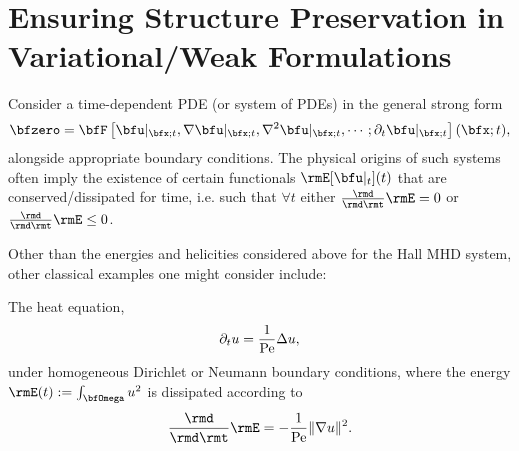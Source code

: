 \section{Ensuring Structure Preservation in Variational/Weak Formulations}

    Consider a time-dependent PDE (or system of PDEs) in the general strong form
    \begin{equation}\label{eqn:general time-dependent PDE}
        \bfzero  =  \bfF\left[\bfu|_{\bfx; t}, \nabla\bfu|_{\bfx; t}, \nabla^{2}\bfu|_{\bfx; t}, \cdots; \partial_{t}\bfu|_{\bfx; t}\right](\bfx; t),
    \end{equation}
    alongside appropriate boundary conditions. The physical origins of such systems often imply the existence of certain functionals $\rmE[\bfu|_{t}](t)$ that are conserved/dissipated for time, i.e. such that $\forall  t$ either $\frac{\rmd}{\rmd\rmt}\rmE  =  0$ or $\frac{\rmd}{\rmd\rmt}\rmE  \leq  0$.
    
    \line
    
    Other than the energies and helicities considered above for the Hall MHD system, other classical examples one might consider include:
    \begin{example}
        The heat equation,
        \begin{equation}
            \partial_{t}u  =  \frac{1}{\mathrm{Pe}}\Delta u,
        \end{equation}
        under homogeneous Dirichlet or Neumann boundary conditions, where the energy $\rmE(t)  :=  \int_{\bfOmega}u^{2}$ is dissipated according to
        \begin{equation}
            \frac{\rmd}{\rmd\rmt}\rmE  =  - \frac{1}{\rmPe}\|\nabla u\|^{2}.
        \end{equation}
    \end{example}
    
